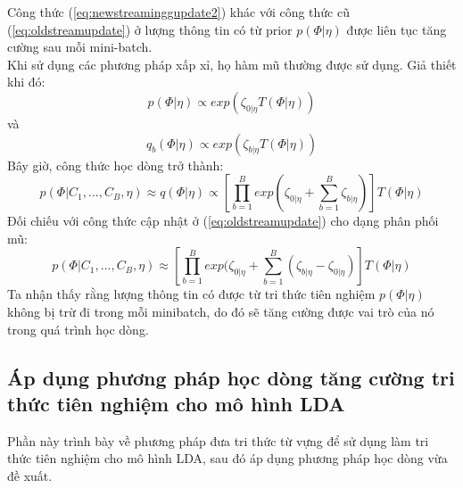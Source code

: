 \documentclass[fontsize=13pt]{scrartcl}
\begin{document}
Công thức (\ref{eq:newstreaminggupdate2}) khác với công thức cũ (\ref{eq:oldstreamupdate}) ở lượng thông tin có từ prior $p(\Phi | \eta)$ được liên tục tăng cường sau mỗi mini-batch.\\
Khi sử dụng các phương pháp xấp xỉ, họ hàm mũ thường được sử dụng. Giả thiết khi đó:
\begin{equation}
 p (\Phi | \eta) \propto exp(\zeta_{0|\eta} T(\Phi | \eta))
\end{equation}
và
\begin{equation}
q_{b}(\Phi | \eta ) \propto exp(\zeta_{b|\eta} T(\Phi | \eta))
\end{equation}
Bây giờ, công thức học dòng trở thành:
\begin{equation}\label{eq:newstreamingupdate}
p (\Phi | C_1,...,C_B,\eta) \approx q(\Phi | \eta) \propto [\prod_{b=1}^{B} exp(\zeta_{0|\eta} + \sum_{b=1}^{B} \zeta_{b|\eta})]T(\Phi | \eta)
\end{equation}
Đối chiếu với công thức cập nhật ở (\ref{eq:oldstreamupdate}) cho dạng phân phối mũ:
\begin{equation}
p (\Phi | C_1,...,C_B,\eta) \approx [\prod_{b=1}^{B} exp(\zeta_{0|\eta} + \sum_{b=1}^{B} (\zeta_{b|\eta}-\zeta_{0|\eta})]T(\Phi | \eta)
\end{equation}
Ta nhận thấy rằng lượng thông tin có được từ tri thức tiên nghiệm $p(\Phi | \eta)$ không bị trừ đi trong mỗi minibatch, do đó sẽ tăng cường được vai trò của nó trong quá trình học dòng.
\subsection{Áp dụng phương pháp học dòng tăng cường tri thức tiên nghiệm cho mô hình LDA}
Phần này trình bày về phương pháp đưa tri thức từ vựng để sử dụng làm tri thức tiên nghiệm cho mô hình LDA, sau đó áp dụng phương pháp học dòng vừa đề xuất.
\end{document}
